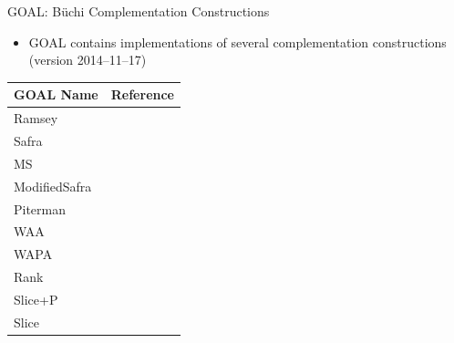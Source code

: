 \documentclass[12pt]{beamer}
\begin{document}
\begin{frame}{GOAL: Büchi Complementation Constructions}
\begin{itemize}
\item GOAL contains implementations of several complementation constructions (version 2014--11--17)
\end{itemize}
\vspace{0.1cm}
\centering
\footnotesize
{\renewcommand{\arraystretch}{1.15}
\begin{tabular}{ll}
\hline
GOAL Name & Reference \\
\hline
Ramsey        & \cite{1985_sistla,PrasadSistla1987217} \\
Safra         & \cite{1988_safra_2,1988_safra_1} \\
MS            & \cite{Muller199569} \\
ModifiedSafra & \cite{2006_althoff} \\
Piterman      & \cite{2006_piterman,2007_piterman} \\
WAA           & \cite{1997_vardi,Kupferman:2001} \\
WAPA          & \cite{1999_thomas} \\
Rank          & \cite{schewe2009buchi} \\
Slice+P       & \cite{vardi2007automata} \\
Slice         & \cite{2008_kaehler} \\
\hline
\end{tabular}}
\end{frame}
\end{document}
